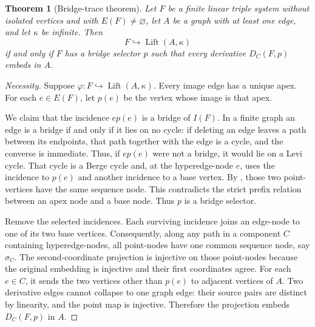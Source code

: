\documentclass[11pt]{amsart}
\newtheorem{theorem}{Theorem}[section]
\theoremstyle{definition}
\theoremstyle{remark}
\numberwithin{equation}{section}
\newcommand{\Lift}{\operatorname{Lift}}
\begin{document}
\begin{theorem}[Bridge-trace theorem]
\label{thm:bridge-trace}
Let $F$ be a finite linear triple system without isolated vertices and
with $E(F)\ne\varnothing$, let $A$ be a graph with at least one edge, and
let $\kappa$ be infinite.
Then
\[
 F\hookrightarrow\Lift(A,\kappa)
\]
if and only if $F$ has a bridge selector $p$ such that every derivative
$D_C(F,p)$ embeds in $A$.
\end{theorem}

\begin{proof}[Necessity]
Suppose $\varphi:F\hookrightarrow\Lift(A,\kappa)$.  Every image edge has
a unique apex.  For each $e\in E(F)$, let $p(e)$ be the vertex whose
image is that apex.

We claim that the incidence $ep(e)$ is a bridge of $I(F)$.  In a finite
graph an edge is a bridge if and only if it lies on no cycle: if deleting
an edge leaves a path between its endpoints, that path together with the
edge is a cycle, and the converse is immediate.  Thus, if $ep(e)$ were
not a bridge, it would lie on a Levi cycle.  That cycle is a Berge cycle
and, at the
hyperedge-node $e$, uses the incidence to $p(e)$ and another incidence
to a base vertex.  By , those two point-vertices
have the same sequence node.  This contradicts the strict prefix
relation between an apex node and a base node.  Thus $p$ is a bridge
selector.

Remove the selected incidences.  Each surviving incidence joins an
edge-node to one of its two base vertices.  Consequently, along any
path in a component $C$ containing hyperedge-nodes, all point-nodes have
one common sequence node, say $\sigma_C$.  The second-coordinate
projection is injective on those point-nodes because the original
embedding is injective and their first coordinates agree.  For each $e\in C$, it sends the two vertices other than $p(e)$ to adjacent vertices of $A$.
Two derivative edges cannot collapse to one graph edge: their source
pairs are distinct by linearity, and the point map is injective.
Therefore the projection embeds $D_C(F,p)$ in $A$.
\end{proof}
\end{document}
